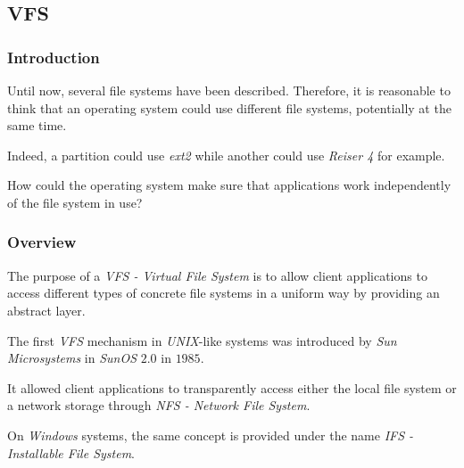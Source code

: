 
\subsection{VFS}


\begin{frame}
  \frametitle{Introduction}

  Until now, several file systems have been described. Therefore, it is
  reasonable to think that an operating system could use different
  file systems, potentially at the same time.

  \-

  Indeed, a partition could use \textit{ext2} while another could use
  \textit{Reiser 4} for example.

  \-

  How could the operating system make sure that applications work
  independently of the file system in use?
\end{frame}


\begin{frame}
  \frametitle{Overview}

  The purpose of a \textit{VFS - Virtual File System} is to allow client
  applications to access different types of concrete file systems in a uniform
  way by providing an abstract layer.

  \-

  The first \textit{VFS} mechanism in \textit{UNIX}-like systems was introduced
  by \textit{Sun Microsystems} in \textit{SunOS} $2.0$ in $1985$.

  \-

  It allowed client applications to transparently access either the local
  file system or a network storage through \textit{NFS - Network File System}.

  \-

  On \textit{Windows} systems, the same concept is provided under the
  name \textit{IFS - Installable File System}.
\end{frame}


